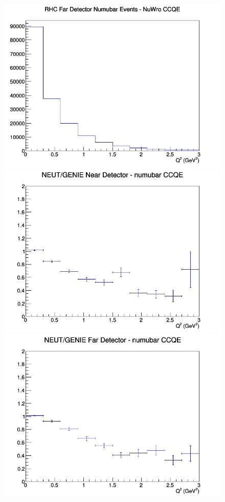 \documentclass[12pt]{article}
\begin{document}
\begin{figure}[h]
\endminipage
{}
\includegraphics[width=\linewidth]{eff_Q2/GAr/CCQE_RHC_FD_numubar_Q2_NuWro.png}
\endminipage
\newline
{}
\includegraphics[width=\linewidth]{eff_Q2/GAr/ratios/CCQE_NEUT_GENIE_numubar_near_Q2.png}
\endminipage
{}
\includegraphics[width=\linewidth]{eff_Q2/GAr/ratios/CCQE_NEUT_GENIE_numubar_far_Q2.png}

\end{figure}
\end{document}
